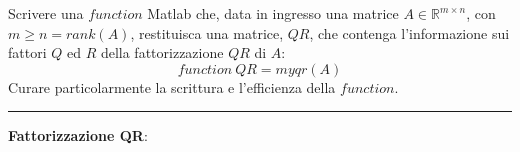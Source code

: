 Scrivere una $function$ Matlab che, data in ingresso una matrice $A\in\mathbb{R}^{m\times n}$, con $m \geq n = rank(A)$, restituisca una matrice, $QR$, che contenga l’informazione sui fattori $Q$ ed $R$ della fattorizzazione $QR$ di $A$:
$$function \ QR = myqr(A)$$
Curare particolarmente la scrittura e l’efficienza della $function$.

\hspace{1cm}
\par\noindent\rule{\textwidth}{0.4pt}
\hspace{1cm}

\textbf{Fattorizzazione QR}:

